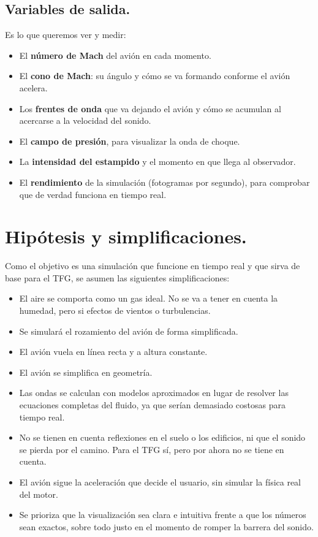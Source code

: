 \documentclass[10.5pt]{article}
\begin{document}
	\subsection{Variables de salida.}
	
	Es lo que queremos ver y medir:
	
	\begin{itemize}
		\item El \textbf{número de Mach} del avión en cada momento.
		\item El \textbf{cono de Mach}: su ángulo y cómo se va formando conforme el avión acelera.
		\item Los \textbf{frentes de onda} que va dejando el avión y cómo se acumulan al acercarse a la velocidad del sonido.
		\item El \textbf{campo de presión}, para visualizar la onda de choque.
		\item La \textbf{intensidad del estampido} y el momento en que llega al observador.
		\item El \textbf{rendimiento} de la simulación (fotogramas por segundo), para comprobar que de verdad funciona en tiempo real.
	\end{itemize}
	
	\section{Hipótesis y simplificaciones.}
	
	Como el objetivo es una simulación que funcione en tiempo real y que sirva de base para el TFG, se asumen las siguientes simplificaciones:
	
	\begin{itemize}
		\item El aire se comporta como un gas ideal. No se va a tener en cuenta la humedad, pero si efectos de vientos o turbulencias.
		\item Se simulará el rozamiento del avión de forma simplificada.
		\item El avión vuela en línea recta y a altura constante.
		\item El avión se simplifica en geometría.
		\item Las ondas se calculan con modelos aproximados en lugar de resolver las ecuaciones completas del fluido, ya que serían demasiado costosas para tiempo real.
		\item No se tienen en cuenta reflexiones en el suelo o los edificios, ni que el sonido se pierda por el camino. Para el TFG sí, pero por ahora no se tiene en cuenta.
		\item El avión sigue la aceleración que decide el usuario, sin simular la física real del motor.
		\item Se prioriza que la visualización sea clara e intuitiva frente a que los números sean exactos, sobre todo justo en el momento de romper la barrera del sonido.
	\end{itemize}
	
\end{document}
